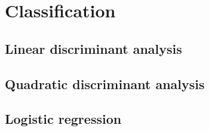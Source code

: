 \section{Classification}
\subsection{Linear discriminant analysis}
\subsection{Quadratic discriminant analysis}
\subsection{Logistic regression}